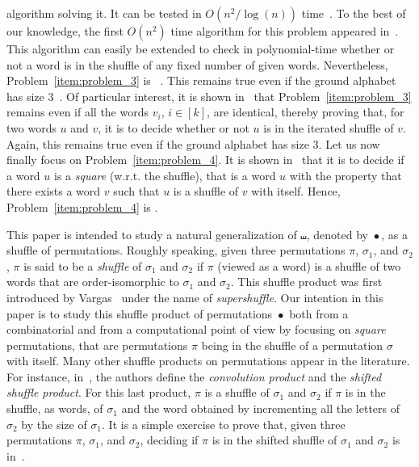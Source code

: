 \documentclass[a4paper]{llncs}
\DeclareMathOperator{\SHUFFLE}{\bullet}
\begin{document}
algorithm solving it. It can be tested in $O\left(n^2 / \log(n)\right)$
time~\cite{Leeuwen:Nivat:IPL:1982}. To the best of our knowledge, the
first $O(n^2)$ time algorithm for this problem appeared
in~\cite{Mansfield:DAM:1983}. This algorithm can easily be extended to
check in polynomial-time whether or not a word is in the shuffle of any
fixed number of given words. Nevertheless, Problem~\ref{item:problem_3}
is \NPC~\cite{Mansfield:DAM:1983,Warmuth:Haussler:JCSS:1984}. This
remains true even if the ground alphabet has size
$3$~\cite{Warmuth:Haussler:JCSS:1984}. Of particular interest,
it is shown in~\cite{Warmuth:Haussler:JCSS:1984} that
Problem~\ref{item:problem_3} remains \NPC even if all the words $v_i$,
$i \in [k]$, are identical, thereby proving that, for two words $u$ and
$v$, it is \NPC to decide whether or not $u$ is in the iterated shuffle
of $v$. Again, this remains true even if the ground alphabet has size $3$.
Let us now finally focus on Problem~\ref{item:problem_4}. It is shown
in~\cite{Buss:Soltys:2014,Rizzi:Vialette:CSR:2013} that it is \NPC to
decide if a word $u$ is a \emph{square} (w.r.t. the shuffle), that is
a word $u$ with the property that there exists a word $v$ such that $u$
is a shuffle of $v$ with itself. Hence, Problem~\ref{item:problem_4}
is \NPC.
\smallskip

This paper is intended to study a natural generalization of $\shuffle$,
denoted by $\SHUFFLE$, as a shuffle of permutations. Roughly speaking,
given three permutations $\pi$, $\sigma_1$, and $\sigma_2$, $\pi$ is
said to be a {\em shuffle} of $\sigma_1$ and $\sigma_2$ if $\pi$ (viewed
as a word) is a shuffle of two words that are order-isomorphic to
$\sigma_1$ and $\sigma_2$. This shuffle product was first introduced by
Vargas~\cite{Vargas:2014} under the name of {\em supershuffle}. Our 
intention in this paper is to study this shuffle product of permutations 
$\SHUFFLE$ both from a combinatorial and from a computational point of 
view by focusing on {\em square} permutations, that are permutations 
$\pi$ being in the shuffle of a permutation $\sigma$ with itself. Many 
other shuffle products on permutations appear in the literature. For 
instance, in~\cite{DHT:IJAC:2002}, the authors define the {\em convolution 
product} and the {\em shifted shuffle product}. For this last product, 
$\pi$ is a shuffle of $\sigma_1$ and $\sigma_2$ if $\pi$ is in the shuffle, 
as words, of $\sigma_1$ and the word obtained by incrementing all the 
letters of $\sigma_2$ by the size of $\sigma_1$. It is a simple exercise 
to prove that, given three permutations $\pi$, $\sigma_1$, and $\sigma_2$,
deciding if $\pi$ is in the shifted shuffle of $\sigma_1$ and $\sigma_2$ 
is in~\Pclass.
\smallskip
\end{document}
